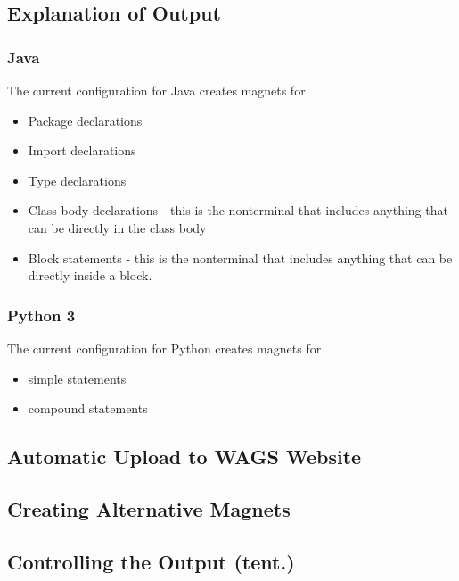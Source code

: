 \documentclass[letter,10pt]{article}
\begin{document}
\subsection{Explanation of Output}

\subsubsection{Java}
The current configuration for Java creates magnets for
\begin{itemize}
 \item Package declarations
 \item Import declarations
 \item Type declarations
 \item Class body declarations - this is the nonterminal that includes 
anything that can be directly in the class body
 \item Block statements - this is the nonterminal that includes 
anything that can be directly inside a block.
\end{itemize}



\subsubsection{Python 3}
The current configuration for Python creates magnets for
\begin{itemize}
 \item simple statements
 \item compound statements
\end{itemize}


\subsection{Automatic Upload to WAGS Website}

\subsection{Creating Alternative Magnets}

\subsection{Controlling the Output (tent.)}
\end{document}
